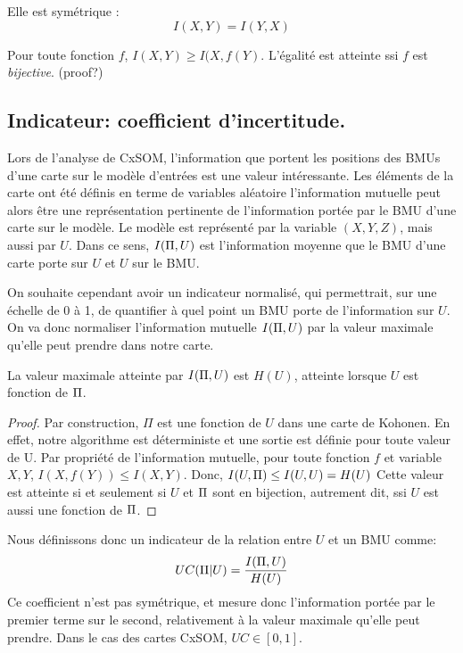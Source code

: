 Elle est symétrique : $$I(X,Y) = I(Y,X)$$

Pour toute fonction $f$, $I(X,Y) \geq I(X,f(Y)$. L'égalité est atteinte ssi $f$ est \emph{bijective}. (proof?)

\subsection{Indicateur: coefficient d'incertitude.}

Lors de l'analyse de CxSOM, l'information que portent les positions des BMUs d'une carte sur le modèle d'entrées est une valeur intéressante. Les éléments de la carte ont été définis en terme de variables aléatoire l'information mutuelle peut alors être une représentation pertinente de l'information portée par le BMU d'une carte sur le modèle. Le modèle est représenté par la variable $(X,Y,Z)$, mais aussi par $U$. Dans ce sens, $I(\Pi, U)$ est l'information moyenne que le BMU d'une carte porte sur $U$ et $U$ sur le BMU.

On souhaite cependant avoir un indicateur normalisé, qui permettrait, sur une échelle de 0 à 1, de quantifier à quel point un BMU porte de l'information sur $U$. On va donc normaliser l'information mutuelle $I(\Pi,U)$ par la valeur maximale qu'elle peut prendre dans notre carte.

\begin{propriete}
La valeur maximale atteinte par $I(\Pi,U)$ est $H(U)$, atteinte lorsque $U$ est fonction de $\Pi$.
\end{propriete}

\begin{proof}
Par construction, $\Pi$ est une fonction de $U$ dans une carte de Kohonen. En effet, notre algorithme est déterministe et une sortie est définie pour toute valeur de U. 
Par propriété de l'information mutuelle, pour toute fonction $f$ et variable $X,Y$, $I(X,f(Y)) \leq I(X,Y) $.
Donc, $I(U,\Pi) \leq I(U,U) = H(U)$
Cette valeur est atteinte si et seulement si $U$ et $\Pi$ sont en bijection, autrement dit, ssi $U$ est aussi une fonction de $\Pi$.

\end{proof}

Nous définissons donc un indicateur de la relation entre $U$ et un BMU comme:
\begin{equation}
UC(\Pi|U) = \frac{I(\Pi,U)}{H(U)}
\end{equation}
Ce coefficient n'est pas symétrique, et mesure donc l'information portée par le premier terme sur le second, relativement à la valeur maximale qu'elle peut prendre. Dans le cas des cartes CxSOM, $UC \in [0,1]$. 

